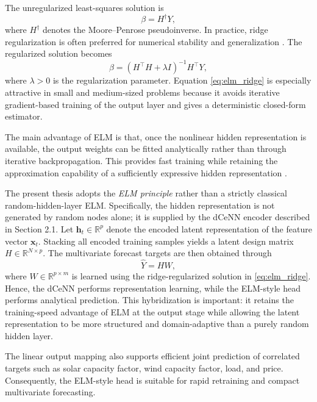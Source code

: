 The unregularized least-squares solution is
\begin{equation}
\beta = H^{\dagger}Y,
\label{eq:elm_pinv}
\end{equation}
where $H^{\dagger}$ denotes the Moore--Penrose pseudoinverse. In practice, ridge regularization is often preferred for numerical stability and generalization \cite{hoerl1970ridge,huang2012elm_regression}. The regularized solution becomes
\begin{equation}
\beta = \left(H^{\top}H + \lambda I\right)^{-1}H^{\top}Y,
\label{eq:elm_ridge}
\end{equation}
where $\lambda > 0$ is the regularization parameter. Equation \eqref{eq:elm_ridge} is especially attractive in small and medium-sized problems because it avoids iterative gradient-based training of the output layer and gives a deterministic closed-form estimator.

The main advantage of ELM is that, once the nonlinear hidden representation is
available, the output weights can be fitted analytically rather than through
iterative backpropagation. This provides fast training while retaining the
approximation capability of a sufficiently expressive hidden representation
\cite{cybenko1989approximation,huang2006universal}.

The present thesis adopts the \emph{ELM principle} rather than a strictly classical random-hidden-layer ELM. Specifically, the hidden representation is not generated by random nodes alone; it is supplied by the dCeNN encoder described in Section 2.1. Let $\mathbf{h}_t \in \mathbb{R}^{p}$ denote the encoded latent representation of the feature vector $\mathbf{x}_t$. Stacking all encoded training samples yields a latent design matrix $H \in \mathbb{R}^{N \times p}$. The multivariate forecast targets are then obtained through
\begin{equation}
\hat{Y} = H W,
\label{eq:elm_head}
\end{equation}
where $W \in \mathbb{R}^{p \times m}$ is learned using the ridge-regularized solution in \eqref{eq:elm_ridge}. Hence, the dCeNN performs representation learning, while the ELM-style head performs analytical prediction. This hybridization is important: it retains the training-speed advantage of ELM at the output stage while allowing the latent representation to be more structured and domain-adaptive than a purely random hidden layer.

The linear output mapping also supports efficient joint prediction of correlated
targets such as solar capacity factor, wind capacity factor, load, and price.
Consequently, the ELM-style head is suitable for rapid retraining and compact
multivariate forecasting.

